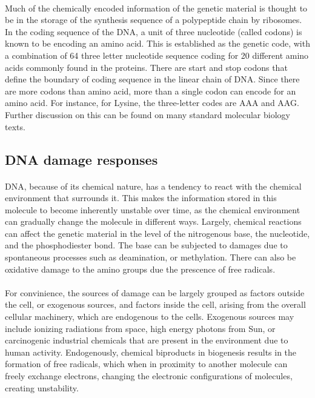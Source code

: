 \paragraph*{} Much of the chemically encoded information of the genetic material is thought to be in the storage of the synthesis sequence of a polypeptide chain by ribosomes. In the coding sequence of the DNA, a unit of three nucleotide (called codons) is known to be encoding an amino acid. This is established as the genetic code, with a combination of 64 three letter nucleotide sequence coding for 20 different amino acids commonly found in the proteins. There are start and stop codons that define the boundary of coding sequence in the linear chain of DNA. Since there are more codons than amino acid, more than a single codon can encode for an amino acid. For instance, for Lysine, the three-letter codes are AAA and AAG. Further discussion on this can be found on many standard molecular biology texts.

\subsection{DNA damage responses}
\paragraph*{} DNA, because of its chemical nature, has a tendency to react with the chemical environment that surrounds it. This makes the information stored in this molecule to become inherently unstable over time, as the chemical environment can gradually change the molecule in different ways. Largely, chemical reactions can affect the genetic material in the level of the nitrogenous base, the nucleotide, and the phosphodiester bond. The base can be subjected to damages due to spontaneous processes such as deamination, or methylation. There can also be oxidative damage to the amino groups due the prescence of free radicals.


\paragraph*{} For convinience, the sources of damage can be largely grouped as factors outside the cell, or exogenous sources, and factors inside the cell, arising from the overall cellular machinery, which are endogenous to the cells. Exogenous sources may include ionizing radiations from space, high energy photons from Sun, or carcinogenic industrial chemicals that are present in the environment due to human activity. Endogenously, chemical biproducts in biogenesis results in the formation of free radicals, which when in proximity to another molecule can freely exchange electrons, changing the electronic configurations of molecules, creating unstability.

